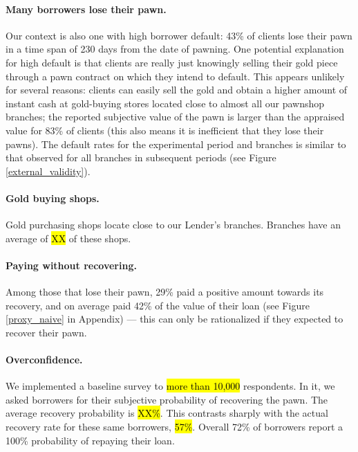 \documentclass[12pt, a4paper]{article}
\begin{document}
\paragraph*{Many borrowers lose their pawn.}
Our context is also one with high borrower default: 43\% of clients lose their pawn in a time span of 230 days from the date of pawning. One potential explanation for high default is that clients are really just knowingly selling their gold piece through a pawn contract on which they intend to default. This appears unlikely for several reasons: clients can easily sell the gold and obtain a higher amount of instant cash at gold-buying stores located close to almost all our pawnshop branches;
the reported subjective value of the pawn is larger than the appraised value for 83\% of clients (this also means it is inefficient that they lose their pawns). The default rates for the experimental period and branches is similar to that observed for all branches in subsequent periods (see Figure \ref{external_validity}).  

\paragraph*{Gold buying shops.} Gold purchasing shops locate close to our Lender's branches. Branches have an average of \hl{XX} of these shops.

\paragraph*{Paying without recovering.} Among those that lose their pawn, 29\% paid a positive amount towards its recovery, and on average paid 42\% of the value of their loan (see Figure \ref{proxy_naive} in Appendix) --- this can only be rationalized if they expected to recover their pawn.

\paragraph*{Overconfidence.} We implemented a baseline survey to \hl{more than 10,000} respondents. In it, we asked borrowers for their subjective probability of recovering the pawn. The average recovery probability is \hl{XX\%}. This contrasts sharply with the actual recovery rate for these same borrowers, \hl{57\%}. Overall 72\% of borrowers report a 100\% probability of repaying their loan.    %
\end{document}
